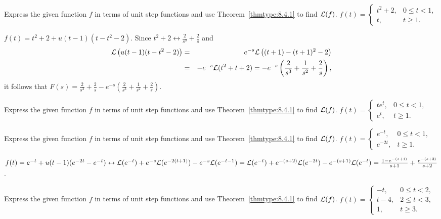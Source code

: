 \documentclass{ximera}
\begin{document}
 \begin{problem}\label{exer:8.4.8}
Express the
given function $f$ in terms of unit step functions
 and use Theorem~\ref{thmtype:8.4.1} to find ${\cal L}(f)$.
 $f(t)=\left\{\begin{array}{cl} t^2+2, &0\le
t<1,\\ t,&t\ge1.\end{array}\right.$

\begin{solution}
$f(t)=t^2+2+u(t-1)(t-t^2-2)$.
Since $t^2+2\leftrightarrow\frac{2}{s^3}+\frac{2}{s}$  and
\begin{eqnarray*}
{\cal L}\left(u(t-1)(t-t^2-2)\right)&=&e^{-s}{\cal
L}\left((t+1)-(t+1)^2-2\right)\\&=&-e^{-s}{\cal
L}(t^2+t+2)=-e^{-s}\left(\frac{2}{s^3}+\frac{1}{s^2}+\frac{2}{s}\right),
\end{eqnarray*}
it follows that $F(s)=\frac{2}{s^3} +\frac{2}{s}-e^{-s}\left(\frac{2}{s^3}+\frac{1}{s^2}+\frac{2}{s}\right)$.
\end{solution}
\end{problem}
 \begin{problem}\label{exer:8.4.9}
Express the
given function $f$ in terms of unit step functions
 and use Theorem~\ref{thmtype:8.4.1} to find ${\cal L}(f)$.
 $f(t)=\left\{\begin{array}{cl} te^t,& 0\le t
<1,\\ e^t,&t\ge1.\end{array}\right.$
\end{problem}

\begin{problem}\label{exer:8.4.10} 
Express the
given function $f$ in terms of unit step functions
 and use Theorem~\ref{thmtype:8.4.1} to find ${\cal L}(f)$.
$f(t)=\left\{\begin{array}{cl}
e^{-t}, &0\le t<1,\\ 
e^{-2t},&t\ge1.\end{array}\right.$

\begin{solution}
$f(t)=e^{-t}+u(t-1)(e^{-2t}-e^{-t})
\leftrightarrow {\cal L}(e^{-t})+e^{-s}{\cal
L}(e^{-2(t+1)})-e^{-s}{\cal L}(e^{-t-1})=
 {\cal L}(e^{-t})+e^{-(s+2)}{\cal
L}(e^{-2t})-e^{-(s+1)}{\cal L}(e^{-t})=
\frac{1-e^{-(s+1)}}{s+1}+\frac{e^{-(s+2)}}{s+2}$.
\end{solution}
\end{problem}

\begin{problem}\label{exer:8.4.11}
Express the
given function $f$ in terms of unit step functions
 and use Theorem~\ref{thmtype:8.4.1} to find ${\cal L}(f)$. 
$f(t)=\left\{\begin{array}{cl} -t,&0 \le
t<2,\\ t-4,&2\le t<3,\\ 1,&t\ge3.
\end{array}\right.$
\end{problem}
\end{document}
